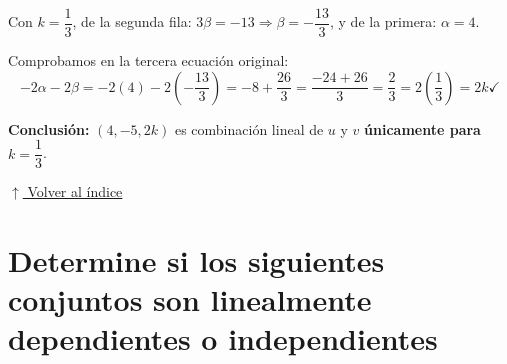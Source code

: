 \documentclass[12pt]{article}
\newcommand{\volverindice}{%
    \vspace{1em}%
    \begin{flushright}%
        \hyperlink{indice}{\small $\uparrow$ Volver al índice}%
    \end{flushright}%
}
\begin{document}
Con $k=\dfrac{1}{3}$, de la segunda fila: $3\beta=-13 \Rightarrow \beta=-\dfrac{13}{3}$, y de la primera: $\alpha=4$.

Comprobamos en la tercera ecuación original:
\[
-2\alpha-2\beta = -2(4)-2\left(-\frac{13}{3}\right) = -8+\frac{26}{3} = \frac{-24+26}{3}=\frac{2}{3} = 2\left(\frac{1}{3}\right) = 2k \checkmark
\]

\textbf{Conclusión:} $(4,-5,2k)$ es combinación lineal de $u$ y $v$ \textbf{únicamente para} $k=\dfrac{1}{3}$.

\volverindice
\newpage

\section{Determine si los siguientes conjuntos son linealmente dependientes o independientes}
\end{document}

